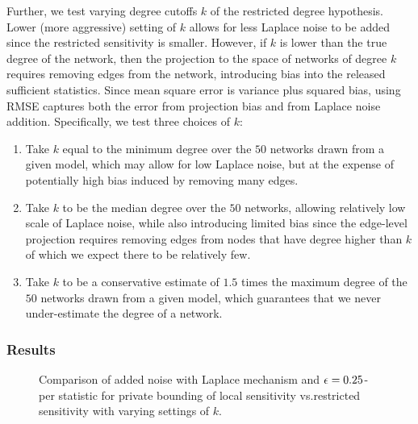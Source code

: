  Further, we test varying degree cutoffs $k$ of the restricted degree hypothesis. Lower (more aggressive) setting of $k$ allows for less Laplace noise to be added since the restricted sensitivity is smaller. However, if $k$ is lower than the true degree of the network, then the projection to the space of networks of degree $k$ requires removing edges from the network, introducing bias into the released sufficient statistics.  Since mean square error is variance plus squared bias, using RMSE captures both the error from projection bias and from Laplace noise addition. Specifically, we test three choices of $k$:
 \vspace{-0.2in}
\begin{enumerate}
	\item Take $k$ equal to the minimum degree over the $50$ networks drawn from a given model, which may allow for low Laplace noise, but at the expense of potentially high bias induced by removing many edges.
	\item Take $k$ to be the median degree over the $50$ networks, allowing relatively low scale of Laplace noise, while also introducing limited bias since the edge-level projection  requires removing edges from nodes that have degree higher than $k$ of which we expect there to be relatively few.
	\item Take $k$ to be a conservative estimate of $1.5$ times the maximum degree of the $50$ networks drawn from a given model, which guarantees that we never under-estimate the degree of a network. 
\end{enumerate}

 \subsubsection{Results}
 \begin{figure}[!h]
 	\caption{Comparison of added noise with Laplace mechanism and $\epsilon = 0.25$-per statistic for private bounding of local sensitivity vs.restricted sensitivity with varying settings of $k$.}
 	\label{fig:edge_noise}
 	\centering
 	

 \end{figure}
 
